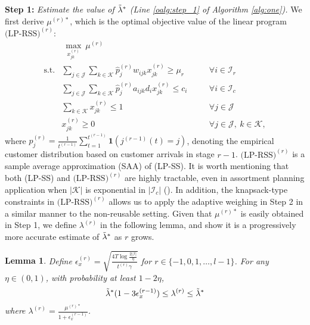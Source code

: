 \documentclass[letterpaper, 10 pt, conference]{ieeeconf}  %
\newcommand{\III}{\mathcal{I}}
\newcommand{\JJJ}{\mathcal{J}}
\newcommand{\KKK}{\mathcal{K}}
\theoremstyle{plain}
\newtheorem{lemma}{Lemma}
\theoremstyle{definition}
\theoremstyle{remark}
\begin{document}
\textbf{Step 1: }\emph{Estimate the value of $\Tilde{\lambda}^*$ (Line \ref{oalg:step_1} of Algorithm \ref{alg:one}).} We first derive $\mu^{(r)*}$, which is the optimal objective value of the linear program $\text{(LP-RSS)}^{(r)}:$ 
\begin{align}
 &~\max\limits_{x^{(r)}_{jk}}  ~\mu^{(r)} & \nonumber\\
\text{s.t.}  &\sum_{j \in \JJJ} \sum_{k\in \KKK} \hat{p}^{(r)}_{j} w_{ijk} x^{(r)}_{jk} \geq \mu_r     &\quad &\forall i\in \III_r   \nonumber\\
&\sum_{j\in \JJJ}\sum_{k\in \KKK} \hat{p}^{(r)}_{j} a_{ijk} d_i x^{(r)}_{jk} \leq c_i       &\quad & \forall i\in \III_c \nonumber\\
&\sum_{k\in \KKK} x^{(r)}_{jk}\leq 1      &\quad &\forall j\in \JJJ \nonumber\\
&x^{(r)}_{jk} \geq 0      &\quad &\forall j\in \JJJ, ~k\in \KKK \nonumber,
\end{align}
where $\hat{p}^{(r)}_{j}=\frac{1}{t^{(r-1)}} \sum^{t^{(r-1)}}_{t=1} \mathbf{1}(j^{(r-1)}(t)=j)$, denoting the empirical customer distribution based on customer arrivals in stage $r-1$. $\text{(LP-RSS)}^{(r)}$ is a sample average approximation (SAA) of (LP-SS). It is worth mentioning that both (LP-SS) and $\text{(LP-RSS)}^{(r)}$ are highly tractable, even in assortment planning application when $|\KKK|$ is exponential in $|\III_c|$ (\cite{bront2009column}). In addition, the knapsack-type constraints in $\text{(LP-RSS)}^{(r)}$ allows us to apply the adaptive weighing in Step 2 in a similar manner to the non-reusable setting. Given that $\mu^{(r)*}$ is easily obtained in Step 1, we define $\lambda^{(r)}$ in the following lemma, and show it is a progressively more accurate estimate of $\Tilde{\lambda}^*$ as $r$ grows. 

\begin{lemma}\label{olem:3.3}
Define $\epsilon^{(r)}_{x} = \sqrt{\frac{4 T \log\frac{2 |\III|}{\eta}}{t^{(r)} \gamma}}$ for $r \in \{-1,0,1,\ldots,l-1\}$. For any $\eta \in (0,1)$, with probability at least $1-2 \eta$,
\begin{equation}
\Tilde{\lambda}^*(1-3\epsilon^{(r-1)}_{x}) \leq \lambda^{(r)} \leq \Tilde{\lambda}^* \nonumber
\end{equation}
where $\lambda^{(r)} = \frac{\mu^{(r)*}}{1+\epsilon^{(r-1)}_{x}}$.
\end{lemma}
\end{document}
